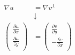 \begin{align}
∇u &= ∇v^⊥ \\
&↓ \\
\left( \begin{array}{r}
\frac{∂u}{∂x} \\
\frac{∂u}{∂y} \\
\end{array} \right)
 &=
\left( \begin{array}{r}
 \frac{∂v}{∂y} \\
-\frac{∂v}{∂x} \\
\end{array} \right)
\end{align}

